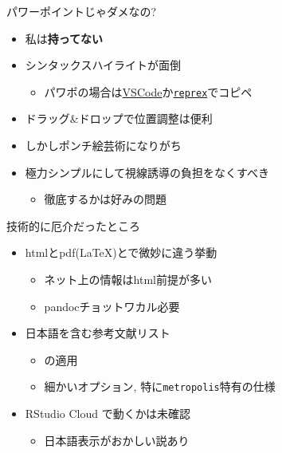 \documentclass[
  14pt,
  ignorenonframetext,
]{beamer}
\providecommand{\tightlist}{%
  \setlength{\itemsep}{0pt}\setlength{\parskip}{0pt}}
\begin{document}
\begin{frame}[fragile]{パワーポイントじゃダメなの?}
\protect\hypertarget{ux30d1ux30efux30fcux30ddux30a4ux30f3ux30c8ux3058ux3083ux30c0ux30e1ux306aux306e}{}

\begin{itemize}
\tightlist
\item
  私は\textbf{持ってない}
\item
  シンタックスハイライトが面倒

  \begin{itemize}
  \tightlist
  \item
    パワポの場合は\href{https://notchained.hatenablog.com/entry/2017/02/20/221446}{VSCode}か\href{https://reprex.tidyverse.org/articles/articles/rtf.html}{\texttt{reprex}}でコピペ
  \end{itemize}
\item
  ドラッグ\&ドロップで位置調整は便利
\item
  しかしポンチ絵芸術になりがち
\item
  極力シンプルにして視線誘導の負担をなくすべき

  \begin{itemize}
  \tightlist
  \item
    徹底するかは好みの問題
  \end{itemize}
\end{itemize}

\end{frame}

\begin{frame}[fragile]{技術的に厄介だったところ}
\protect\hypertarget{ux6280ux8853ux7684ux306bux5384ux4ecbux3060ux3063ux305fux3068ux3053ux308d}{}

\begin{itemize}
\tightlist
\item
  htmlとpdf(\LaTeX)とで微妙に違う挙動

  \begin{itemize}
  \tightlist
  \item
    ネット上の情報はhtml前提が多い
  \item
    pandocチョットワカル必要
  \end{itemize}
\item
  日本語を含む参考文献リスト

  \begin{itemize}
  \tightlist
  \item
    \upBibTeX の適用
  \item
    細かいオプション, 特に\texttt{metropolis}特有の仕様
  \end{itemize}
\item
  RStudio Cloud で動くかは未確認

  \begin{itemize}
  \tightlist
  \item
    日本語表示がおかしい説あり
  \end{itemize}
\end{itemize}

\end{frame}
\end{document}
